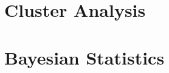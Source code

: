 \documentclass[8pt]{extarticle}
\begin{document}


\section{Cluster Analysis}




\section{Bayesian Statistics}
\end{document}
